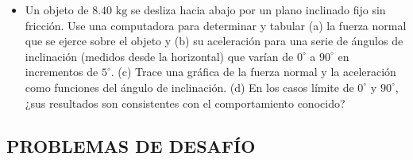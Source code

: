 \documentclass[11pt,a4paper]{article}
\begin{document}
\begin{itemize}
    \item[\textbf{50.}] Un objeto de $8.40 \text{ kg}$ se desliza hacia abajo por un plano inclinado fijo sin fricción. Use una computadora para determinar y tabular (a) la fuerza normal que se ejerce sobre el objeto y (b) su aceleración para una serie de ángulos de inclinación (medidos desde la horizontal) que varían de $0^\circ$ a $90^\circ$ en incrementos de $5^\circ$. (c) Trace una gráfica de la fuerza normal y la aceleración como funciones del ángulo de inclinación. (d) En los casos límite de $0^\circ$ y $90^\circ$, ¿sus resultados son consistentes con el comportamiento conocido?
    \vspace*{7cm}
\end{itemize}

\newpage

\subsection*{PROBLEMAS DE DESAFÍO}
\end{document}

